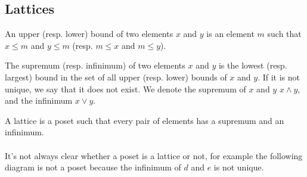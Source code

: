   \subsection{Lattices}

  \begin{definition}
    An upper (resp. lower) bound of two elements $x$ and $y$ is an element $m$ such that $x \le m$ and $y \le m$ (resp. $m \le x$ and $m \le y$).
  \end{definition}

  \begin{definition}
    The supremum (resp. infinimum) of two elements $x$ and $y$ is the lowest (resp. largest) bound in the set of all upper (resp. lower) bounds of $x$ and $y$. If it is not unique, we say that it does not exist. We denote the supremum of $x$ and $y$ $x \wedge y$, and the infinimum $ x \vee y$.
  \end{definition}

  \begin{definition}[Lattice]
    A lattice is a poset such that every pair of elements has a supremum and an infinimum.
  \end{definition}

  \paragraph{}
  It's not always clear whether a poset is a lattice or not, for example the following diagram is not a poset because the infinimum of $d$ and $e$ is not unique.

  \begin{figure}[H]
    \begin{center}
      \caption{}
    \end{center}
  \end{figure}
